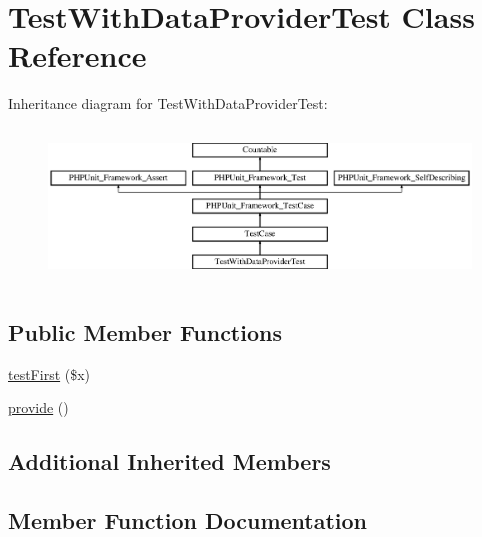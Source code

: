 \hypertarget{class_foo_1_1_data_provider_issue2859_1_1_test_with_data_provider_test}{}\section{Test\+With\+Data\+Provider\+Test Class Reference}
\label{class_foo_1_1_data_provider_issue2859_1_1_test_with_data_provider_test}
Inheritance diagram for Test\+With\+Data\+Provider\+Test\+:\begin{figure}[H]
\begin{center}
\leavevmode
\includegraphics[height=4.129793cm]{class_foo_1_1_data_provider_issue2859_1_1_test_with_data_provider_test}
\end{center}
\end{figure}
\subsection*{Public Member Functions}
\begin{DoxyCompactItemize}
\item 
\mbox{\hyperlink{class_foo_1_1_data_provider_issue2859_1_1_test_with_data_provider_test_af8ab67a72789da589982c3966d8642ef}{test\+First}} (\$x)
\item 
\mbox{\hyperlink{class_foo_1_1_data_provider_issue2859_1_1_test_with_data_provider_test_a70dcc3876ac2d22d8895b012ccd46daf}{provide}} ()
\end{DoxyCompactItemize}
\subsection*{Additional Inherited Members}


\subsection{Member Function Documentation}
\mbox{\label{class_foo_1_1_data_provider_issue2859_1_1_test_with_data_provider_test_a70dcc3876ac2d22d8895b012ccd46daf}} 
